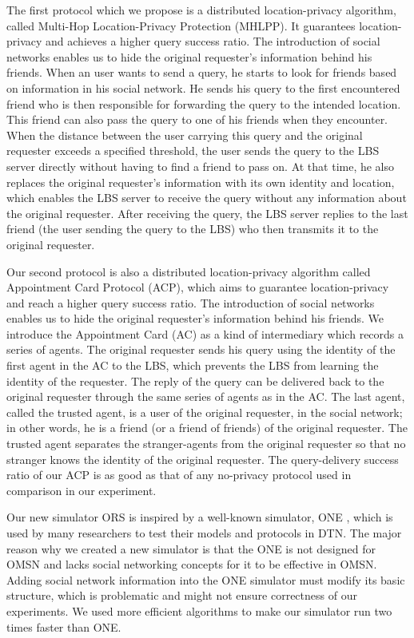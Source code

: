 The first protocol which we propose is a distributed location-privacy algorithm, called Multi-Hop Location-Privacy Protection (MHLPP). It guarantees location-privacy and achieves a higher query success ratio. The introduction of social networks enables us to hide the original requester's information behind his friends. When an user wants to send a query, he starts to look for friends based on information in his social network. He sends his query to the first encountered friend who is then responsible for forwarding the query to the intended location. This friend can also pass the query to one of his friends when they encounter. When the distance between the user carrying this query and the original requester exceeds a specified threshold, the user sends the query to the LBS server directly without having to find a friend to pass on. At that time, he also replaces the original requester's information with its own identity and location, which enables the LBS server to receive the query without any information about the original requester. After receiving the query, the LBS server replies to the last friend (the user sending the query to the LBS) who then transmits it to the original requester.

Our second protocol is also a distributed location-privacy algorithm called Appointment Card Protocol (ACP), which aims to guarantee location-privacy and reach a higher query success ratio. The introduction of social networks enables us to hide the original requester's information behind his friends. We introduce the Appointment Card (AC) as a kind of intermediary which records a series of agents. The original requester sends his query using the identity of the first agent in the AC to the LBS, which prevents the LBS from learning the identity of the requester. The reply of the query can be delivered back to the original requester through the same series of agents as in the AC. The last agent, called the trusted agent, is a user of the original requester, in the social network; in other words, he is a friend (or a friend of friends) of the original requester. The trusted agent separates the stranger-agents from the original requester so that no stranger knows the identity of the original requester. The query-delivery success ratio of our ACP is as good as that of any no-privacy protocol used in comparison in our experiment.

Our new simulator ORS is inspired by a well-known simulator, ONE \cite {C35}, which is used by many researchers to test their models and protocols in DTN. The major reason why we created a new simulator is that the ONE is not designed for OMSN and lacks social networking concepts for it to be effective in OMSN. Adding social network information into the ONE simulator must modify its basic structure, which is problematic and might not ensure correctness of our experiments. We used more efficient algorithms to make our simulator run two times faster than ONE.



